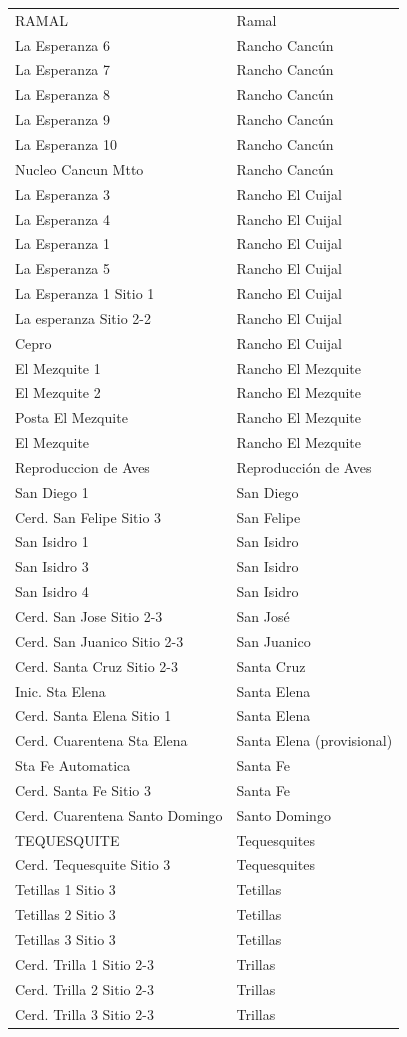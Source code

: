 \documentclass[11pt]{article}
\begin{document}
\begin{longtable}{@{}p{7cm}p{7cm}@{}}
RAMAL & Ramal \\
La Esperanza 6 & Rancho Cancún \\
La Esperanza 7 & Rancho Cancún \\
La Esperanza 8 & Rancho Cancún \\
La Esperanza 9 & Rancho Cancún \\
La Esperanza 10 & Rancho Cancún \\
Nucleo Cancun Mtto & Rancho Cancún \\
La Esperanza 3 & Rancho El Cuijal \\
La Esperanza 4 & Rancho El Cuijal \\
La Esperanza 1 & Rancho El Cuijal \\
La Esperanza 5 & Rancho El Cuijal \\
La Esperanza 1 Sitio 1 & Rancho El Cuijal \\
La esperanza Sitio 2-2 & Rancho El Cuijal \\
Cepro & Rancho El Cuijal \\
El Mezquite 1 & Rancho El Mezquite \\
El Mezquite 2 & Rancho El Mezquite \\
Posta El Mezquite & Rancho El Mezquite \\
El Mezquite & Rancho El Mezquite \\
Reproduccion de Aves & Reproducción de Aves \\
San Diego 1 & San Diego \\
Cerd. San Felipe Sitio 3 & San Felipe \\
San Isidro 1 & San Isidro \\
San Isidro 3 & San Isidro \\
San Isidro 4 & San Isidro \\
Cerd. San Jose Sitio 2-3 & San José \\
Cerd. San Juanico Sitio 2-3 & San Juanico \\
Cerd. Santa Cruz Sitio 2-3 & Santa Cruz \\
Inic. Sta Elena & Santa Elena \\
Cerd. Santa Elena Sitio 1 & Santa Elena \\
Cerd. Cuarentena Sta Elena & Santa Elena (provisional) \\
Sta Fe Automatica & Santa Fe \\
Cerd. Santa Fe Sitio 3 & Santa Fe \\
Cerd. Cuarentena Santo Domingo & Santo Domingo \\
TEQUESQUITE & Tequesquites \\
Cerd. Tequesquite Sitio 3 & Tequesquites \\
Tetillas 1 Sitio 3 & Tetillas \\
Tetillas 2 Sitio 3 & Tetillas \\
Tetillas 3 Sitio 3 & Tetillas \\
Cerd. Trilla 1 Sitio 2-3 & Trillas \\
Cerd. Trilla 2 Sitio 2-3 & Trillas \\
Cerd. Trilla 3 Sitio 2-3 & Trillas \\
\end{longtable}
\end{document}

